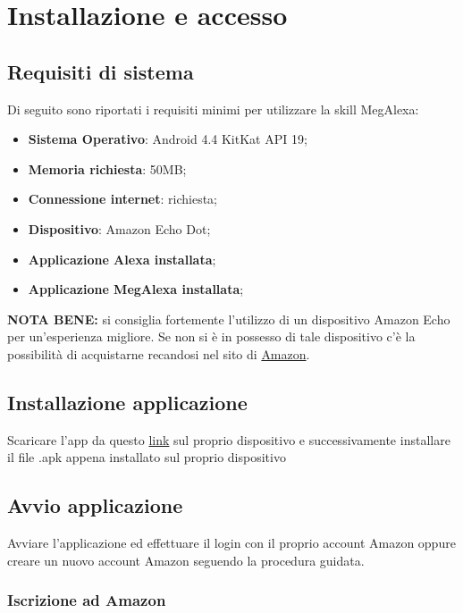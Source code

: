 \chapter{Installazione e accesso}
\label{Installazione}

\section{Requisiti di sistema}
Di seguito sono riportati i requisiti minimi per utilizzare la skill MegAlexa:

\begin{itemize}
	\item \textbf{Sistema Operativo}: Android 4.4 KitKat API 19;
	\item \textbf{Memoria richiesta}: 50MB;
	\item \textbf{Connessione internet}: richiesta;
	\item \textbf{Dispositivo}: Amazon Echo Dot;
	\item \textbf{Applicazione Alexa installata};
	\item \textbf{Applicazione MegAlexa installata};
	
	
\end{itemize}

\textbf{NOTA BENE:} si consiglia fortemente l'utilizzo di un dispositivo Amazon Echo per un'esperienza migliore. Se non si è in possesso di tale dispositivo c'è la possibilità di acquistarne recandosi nel sito di \href{https://www.amazon.it}{Amazon}.

\section{Installazione applicazione}
Scaricare l'app da questo \href{https://www.google.com/drive/}{link} sul proprio dispositivo
e successivamente installare il file .apk appena installato sul proprio dispositivo

\section{Avvio applicazione}
Avviare l'applicazione ed effettuare il login con il proprio account Amazon oppure creare un nuovo account Amazon seguendo la procedura guidata.
\newpage
\subsection{Iscrizione ad Amazon}

